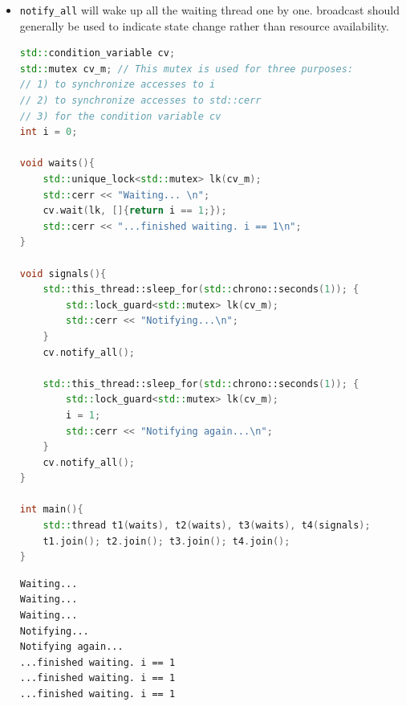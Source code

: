 \documentclass[a4paper,11pt,twoside]{book}
\begin{document}
\begin{itemize}
\begin{lstlisting}[frame=single, language=c++]
	std::cout << "Worker thread is processing data\n";
	data += " after processing"; 	// after the wait, we own the lock.
	
	processed = true; // Send data back to main()
	std::cout << "Worker thread signals data processing completed\n";
	
	// Manual unlocking is done before notifying, to avoid waking up
	// the waiting thread only to block again (see notify_one for details)
	lk.unlock();
	cv.notify_one();
}

int main(){
	std::thread worker(worker_thread);
	data = "Example data";
	{ // send data to the worker thread
		std::lock_guard<std::mutex> lk(m);
		ready = true;
		std::cout << "main() signals data ready for processing\n";
	}
	cv.notify_one(); //tell worker data is ready.
	{ // wait for the worker
		std::unique_lock<std::mutex> lk(m);
		cv.wait(lk, []{return processed;});
	}
	std::cout << "Back in main(), data = " << data << '\n';
	worker.join();
}
\end{lstlisting}


    \item \texttt{notify\_all} will wake up all the waiting thread one by one. broadcast should generally be used to indicate state change rather than resource availability. 
\begin{lstlisting}[frame=single, language=c++]
std::condition_variable cv;
std::mutex cv_m; // This mutex is used for three purposes:
// 1) to synchronize accesses to i
// 2) to synchronize accesses to std::cerr
// 3) for the condition variable cv
int i = 0;

void waits(){
	std::unique_lock<std::mutex> lk(cv_m);
	std::cerr << "Waiting... \n";
	cv.wait(lk, []{return i == 1;});
	std::cerr << "...finished waiting. i == 1\n";
}

void signals(){
	std::this_thread::sleep_for(std::chrono::seconds(1)); {
		std::lock_guard<std::mutex> lk(cv_m);
		std::cerr << "Notifying...\n";
	}
	cv.notify_all();
	
	std::this_thread::sleep_for(std::chrono::seconds(1)); {
		std::lock_guard<std::mutex> lk(cv_m);
		i = 1;
		std::cerr << "Notifying again...\n";
	}
	cv.notify_all();
}

int main(){
	std::thread t1(waits), t2(waits), t3(waits), t4(signals);
	t1.join(); t2.join(); t3.join(); t4.join();
}
\end{lstlisting}

\begin{lstlisting}
Waiting...
Waiting...
Waiting...
Notifying...
Notifying again...
...finished waiting. i == 1
...finished waiting. i == 1
...finished waiting. i == 1
\end{lstlisting}


\end{itemize}
\end{document}
